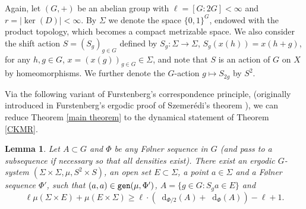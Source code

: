 \documentclass[reqno]{amsart}
\newcommand*\diff{\mathop{}\!\mathrm{d}}
\newtheorem{lemma}[theorem]{Lemma}
\theoremstyle{definition}
\theoremstyle{remark}
\theoremstyle{remark}
\newcommand{\gen}{\texttt{\textup{gen}}}
\newcommand{\Folner}{F\o{}lner}
\begin{document}
Again, let $(G,+)$ be an abelian group with $\ell=[G: 2G] < \infty$ and $r=|\ker(D)|<\infty$. By $\Sigma$ we denote the space $\{0,1\}^{G}$, endowed 
with the product topology, which becomes a compact metrizable 
space. 
We also consider the shift action $S=(S_g)_{g\in G}$ defined by
$S_g\colon \Sigma \to \Sigma$, $S_g(x(h))=x(h+g)$, for any 
$h,g\in G$, $x=(x(g))_{g\in G} \in \Sigma$, and note that 
$S$ is an action of $G$ on $X$ by homeomorphisms.
We further denote the $G$-action $g\mapsto S_{2g}$ by $S^2$.

Via the following variant of Furstenberg's correspondence 
principle, (originally introduced in Furstenberg's ergodic 
proof of Szemer\'edi's theorem \cite{Furstenberg77}), we can 
reduce 
Theorem \ref{main theorem} to the dynamical statement of 
Theorem \ref{CKMR}.

\begin{lemma}\label{correspondence}
Let $A\subset G$ and $\Phi$ be any \Folner{} sequence in $G$ 
(and pass to a subsequence if necessary so that all densities 
exist). 
There exist an ergodic $G$-system $(\Sigma 
\times \Sigma, \mu, S^2 \times S)$, an open set $E\subset \Sigma$, a point $a\in \Sigma$ and a \Folner{} sequence 
$\Phi'$, such that $(a,a)\in \gen(\mu,\Phi')$, $A=\{g\in G\colon S_g a \in E\}$ and 
\begin{equation}\label{dbound_no_shift}
    \ell\mu(\Sigma\times E) + \mu(E\times\Sigma) 
    \geq \ell \cdot (\diff_{\Phi/2}(A) + \diff_{\Phi}(A) ) - \ell +1.
\end{equation}
\end{lemma}
\end{document}
